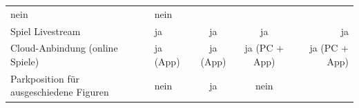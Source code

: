 \begin{longtable}[]{@{}llccr@{}}
\begin{minipage}[t]{0.15\columnwidth}
nein\strut
\end{minipage} & \begin{minipage}[t]{0.13\columnwidth}\raggedleft
nein\strut
\end{minipage}\tabularnewline
\begin{minipage}[t]{0.19\columnwidth}\raggedright
Spiel Livestream\strut
\end{minipage} & \begin{minipage}[t]{0.19\columnwidth}\raggedright
ja\strut
\end{minipage} & \begin{minipage}[t]{0.20\columnwidth}\centering
ja\strut
\end{minipage} & \begin{minipage}[t]{0.15\columnwidth}\centering
ja\strut
\end{minipage} & \begin{minipage}[t]{0.13\columnwidth}\raggedleft
ja\strut
\end{minipage}\tabularnewline
\begin{minipage}[t]{0.19\columnwidth}\raggedright
Cloud-Anbindung (online Spiele)\strut
\end{minipage} & \begin{minipage}[t]{0.19\columnwidth}\raggedright
ja (App)\strut
\end{minipage} & \begin{minipage}[t]{0.20\columnwidth}\centering
ja (App)\strut
\end{minipage} & \begin{minipage}[t]{0.15\columnwidth}\centering
ja (PC + App)\strut
\end{minipage} & \begin{minipage}[t]{0.13\columnwidth}\raggedleft
ja (PC + App)\strut
\end{minipage}\tabularnewline
\begin{minipage}[t]{0.19\columnwidth}\raggedright
Parkposition für ausgeschiedene Figuren\strut
\end{minipage} & \begin{minipage}[t]{0.19\columnwidth}\raggedright
nein\strut
\end{minipage} & \begin{minipage}[t]{0.20\columnwidth}\centering
ja\strut
\end{minipage} & \begin{minipage}[t]{0.15\columnwidth}\centering
nein\strut
\end{minipage} & \begin{minipage}[t]{0.13\columnwidth}\raggedleft

\end{minipage}
\end{longtable}

